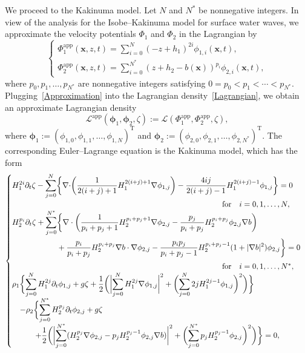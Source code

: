 \documentclass[11pt,leqno]{article}
\numberwithin{equation}{section}
\numberwithin{figure}{section}
\begin{document}
We proceed to the Kakinuma model. 
Let $N$ and $N^*$ be nonnegative integers. 
In view of the analysis for the Isobe--Kakinuma model for surface water waves, 
we approximate the velocity potentials $\Phi_1$ and $\Phi_2$ in the Lagrangian by 
%
\begin{equation}\label{Approximation}
\begin{cases}
 \displaystyle
  \Phi_1^\mathrm{app}(\bm{x},z,t) = \sum_{i=0}^N (-z+h_1)^{2i}\phi_{1,i}(\bm{x},t), \\[2.5ex]
 \displaystyle
  \Phi_2^\mathrm{app}(\bm{x},z,t) = \sum_{i=0}^{N^*} (z+h_2-b(\bm{x}))^{p_i}\phi_{2,i}(\bm{x},t),
\end{cases}
\end{equation}
%
where $p_0,p_1,\ldots,p_{N^*}$ are nonnegative integers satisfying $0=p_0<p_1<\cdots<p_{N^*}$. 
%
Plugging~\eqref{Approximation} into the Lagrangian density~\eqref{Lagrangian}, 
we obtain an approximate Lagrangian density 
%
\[
\mathscr{L}^\mathrm{app}(\bm{\phi}_1,\bm{\phi}_2,\zeta)
:=\mathscr{L}(\Phi_1^\mathrm{app},\Phi_2^\mathrm{app},\zeta),
\]
%
where $\bm{\phi}_1:=(\phi_{1,0},\phi_{1,1},\ldots,\phi_{1,N})^\mathrm{T}$ and 
$\bm{\phi}_2:=(\phi_{2,0},\phi_{2,1},\ldots,\phi_{2,N^*})^\mathrm{T}$. 
The corresponding Euler--Lagrange equation is the Kakinuma model, which has the form 
%
\begin{equation}\label{KakinumaModel}
\begin{cases}
\displaystyle
 H_1^{2i}\partial_t\zeta - \sum_{j=0}^N\biggl\{ \nabla\cdot\biggr(
  \frac{1}{2(i+j)+1}H_1^{2(i+j)+1}\nabla\phi_{1,j} \biggr)
  - \frac{4ij}{2(i+j)-1}H_1^{2(i+j)-1}\phi_{1,j} \biggr\}=0 \\
\makebox[27em]{}\mbox{for}\quad i=0,1,\ldots,N, \\
\displaystyle
 H_2^{p_i}\partial_t\zeta + \sum_{j=0}^{N^*} \biggl\{ \nabla\cdot\biggl(
   \frac{1}{p_i+p_j+1}H_2^{p_i+p_j+1}\nabla\phi_{2,j}
   -\frac{p_j}{p_i+p_j}H_2^{p_i+p_j}\phi_{2,j}\nabla b\biggr) \\
  \displaystyle\phantom{ H_2^{p_i}\partial_t\zeta + \sum_{j=0}^N }
   +\frac{p_i}{p_i+p_j}H_2^{p_i+p_j}\nabla b\cdot\nabla\phi_{2,j}
   -\frac{p_ip_j}{p_i+p_j-1}H_2^{p_i+p_j-1}(1 + |\nabla b|^2)\phi_{2,j}\biggr\}=0 \\
\makebox[27em]{}\mbox{for}\quad i=0,1,\ldots,N^*, \\
\displaystyle
 \rho_1\biggl\{ \sum_{j=0}^NH_1^{2j}\partial_t\phi_{1,j} + g\zeta + \frac12\biggl(
  \biggl|\sum_{j=0}^NH_1^{2j}\nabla\phi_{1,j}\biggr|^2
  + \biggl(\sum_{j=0}^N2jH_1^{2j-1}\phi_{1,j}\biggr)^2 \biggr) \biggr\} \\
\displaystyle\quad
 - \rho_2\biggl\{ \sum_{j=0}^{N^*} H_2^{p_j} \partial_t \phi_{2,j} + g\zeta \\
\displaystyle\qquad\quad
   + \frac12 \biggl( \biggl| \sum_{j=0}^{N^*} ( H_2^{p_j}\nabla\phi_{2,j} - p_j H_2^{p_j-1}\phi_{2,j}\nabla b ) \biggr|^2 
   + \biggl( \sum_{j=0}^{N^*} p_j H_2^{p_j-1} \phi_{2,j} \biggr)^2 \biggr) \biggr\} = 0,
\end{cases}
\end{equation}
\end{document}
